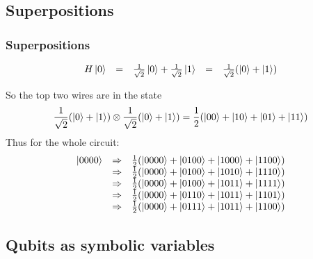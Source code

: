 \documentclass{beamer}
\newcommand{\half}{\frac{1}{2}}
\newcommand{\shalf}{\frac{1}{\sqrt{2}}}
\begin{document}

\subsection[Superposition]{Superpositions}

\begin{frame}
  \frametitle{Superpositions}
  
\[\begin{array}{rclcl}
H\ket{0} &=& \shalf\ket{0} + \shalf\ket{1}
         &=& \frac{1}{\sqrt{2}} (\ket{0} + \ket{1})
 \end{array}\]

\begin{overprint}
So the top two wires are in the state
\[ \shalf(\ket{0}+\ket{1}) \otimes 
   \shalf(\ket{0}+\ket{1}) 
   = 
\half(\ket{00} + \ket{10} + \ket{01} + \ket{11})
\]
Thus for the whole circuit:
\[\begin{array}{rcl}
    \ket{0000} &\Rightarrow&
      \half (\ket{0000} + \ket{0100} + \ket{1000} + \ket{1100}) \\
    &\Rightarrow& 
      \half (\ket{0000} + \ket{0100} + \ket{1010} + \ket{1110}) \\
    &\Rightarrow& 
      \half (\ket{0000} + \ket{0100} + \ket{1011} + \ket{1111}) \\
    &\Rightarrow& 
      \half (\ket{0000} + \ket{0110} + \ket{1011} + \ket{1101}) \\
    &\Rightarrow& 
      \half (\ket{0000} + \ket{0111} + \ket{1011} + \ket{1100}) 
 \end{array}\]
\end{overprint}
\end{frame}

\subsection[Symbolic]{Qubits as symbolic variables}
\end{document}
